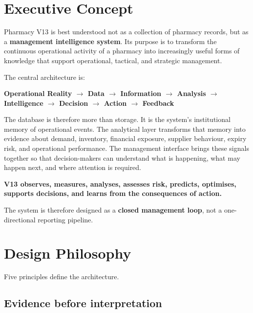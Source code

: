 \documentclass[11pt,a4paper]{article}
\begin{document}
\tableofcontents
\newpage

\section{Executive Concept}

Pharmacy V13 is best understood not as a collection of pharmacy records, but as
a \textbf{management intelligence system}. Its purpose is to transform the
continuous operational activity of a pharmacy into increasingly useful forms
of knowledge that support operational, tactical, and strategic management.

The central architecture is:

\begin{center}
\Large
\textbf{\color{navy}
Operational Reality $\rightarrow$ Data $\rightarrow$ Information
$\rightarrow$ Analysis $\rightarrow$ Intelligence $\rightarrow$ Decision
$\rightarrow$ Action $\rightarrow$ Feedback}
\end{center}

The database is therefore more than storage. It is the system's institutional
memory of operational events. The analytical layer transforms that memory into
evidence about demand, inventory, financial exposure, supplier behaviour,
expiry risk, and operational performance. The management interface brings
these signals together so that decision-makers can understand what is
happening, what may happen next, and where attention is required.

\begin{principle}
\centering
\large
\textbf{V13 observes, measures, analyses, assesses risk, predicts, optimises,
supports decisions, and learns from the consequences of action.}
\end{principle}

The system is therefore designed as a \textbf{closed management loop}, not a
one-directional reporting pipeline.

\section{Design Philosophy}

Five principles define the architecture.

\subsection{Evidence before interpretation}
\end{document}
